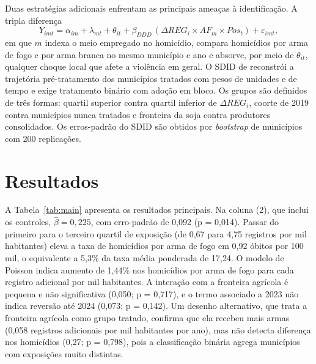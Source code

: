 \documentclass[11pt,a4paper]{article}
\begin{document}
Duas estratégias adicionais enfrentam as principais ameaças à identificação. A tripla diferença
\begin{equation}
Y_{imt} = \alpha_{im} + \lambda_{mt} + \theta_{it} + \beta_{DDD}\,(\Delta REG_i\times AF_m\times Pos_t) + \varepsilon_{imt},
\end{equation}
em que $m$ indexa o meio empregado no homicídio, compara homicídios por arma de fogo e por arma branca no mesmo município e ano e absorve, por meio de $\theta_{it}$, qualquer choque local que afete a violência em geral. O SDID de \citet{arkhangelsky2021} reconstrói a trajetória pré-tratamento dos municípios tratados com pesos de unidades e de tempo e exige tratamento binário com adoção em bloco. Os grupos são definidos de três formas: quartil superior contra quartil inferior de $\Delta REG_i$, coorte de 2019 contra municípios nunca tratados e fronteira da soja contra produtores consolidados. Os erros-padrão do SDID são obtidos por \textit{bootstrap} de municípios com 200 replicações.

\section{Resultados}\label{sec:resultados}

A Tabela~\ref{tab:main} apresenta os resultados principais. Na coluna (2), que inclui os controles, $\hat\beta = 0{,}225$, com erro-padrão de 0{,}092 (p = 0{,}014). Passar do primeiro para o terceiro quartil de exposição (de 0{,}67 para 4{,}75 registros por mil habitantes) eleva a taxa de homicídios por arma de fogo em 0{,}92 óbitos por 100 mil, o equivalente a 5{,}3\% da taxa média ponderada de 17{,}24. O modelo de Poisson indica aumento de 1{,}44\% nos homicídios por arma de fogo para cada registro adicional por mil habitantes. A interação com a fronteira agrícola é pequena e não significativa (0{,}050; p = 0{,}717), e o termo associado a 2023 não indica reversão até 2024 (0{,}073; p = 0{,}142). Um desenho alternativo, que trata a fronteira agrícola como grupo tratado, confirma que ela recebeu mais armas (0{,}058 registros adicionais por mil habitantes por ano), mas não detecta diferença nos homicídios (0{,}27; p = 0{,}798), pois a classificação binária agrega municípios com exposições muito distintas.
\end{document}
